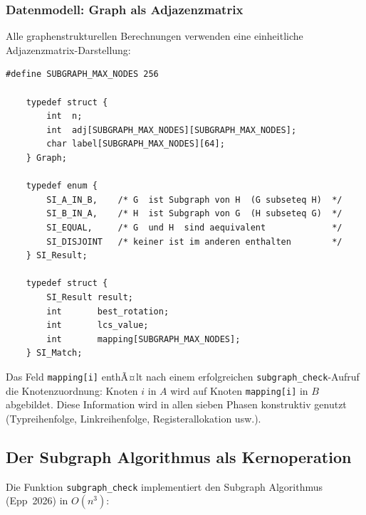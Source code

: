 ﻿\documentclass[a4paper,12pt]{article}
\theoremstyle{definition}
\begin{document}
\subsubsection{Datenmodell: Graph als Adjazenzmatrix}

Alle graphenstrukturellen Berechnungen verwenden eine einheitliche
Adjazenzmatrix-Darstellung:

\begin{lstlisting}[style=cstyle, caption={Graph-Datenstruktur (subgraph.h)},
	label=lst:graph]
	#define SUBGRAPH_MAX_NODES 256
	
	typedef struct {
		int  n;
		int  adj[SUBGRAPH_MAX_NODES][SUBGRAPH_MAX_NODES];
		char label[SUBGRAPH_MAX_NODES][64];
	} Graph;
	
	typedef enum {
		SI_A_IN_B,    /* G  ist Subgraph von H  (G subseteq H)  */
		SI_B_IN_A,    /* H  ist Subgraph von G  (H subseteq G)  */
		SI_EQUAL,     /* G  und H  sind aequivalent             */
		SI_DISJOINT   /* keiner ist im anderen enthalten        */
	} SI_Result;
	
	typedef struct {
		SI_Result result;
		int       best_rotation;
		int       lcs_value;
		int       mapping[SUBGRAPH_MAX_NODES];
	} SI_Match;
\end{lstlisting}

Das Feld \texttt{mapping[i]} enthÃ¤lt nach einem erfolgreichen
\texttt{subgraph\_check}-Aufruf die Knotenzuordnung: Knoten $i$ in $A$ wird
auf Knoten \texttt{mapping[i]} in $B$ abgebildet. Diese Information wird in
allen sieben Phasen konstruktiv genutzt (Typreihenfolge, Linkreihenfolge,
Registerallokation usw.).

\subsection{Der Subgraph Algorithmus als Kernoperation}
\label{sec:impl-subgraph}

Die Funktion \texttt{subgraph\_check} implementiert den Subgraph Algorithmus
(Epp~2026) in $O(n^3)$:
\end{document}

